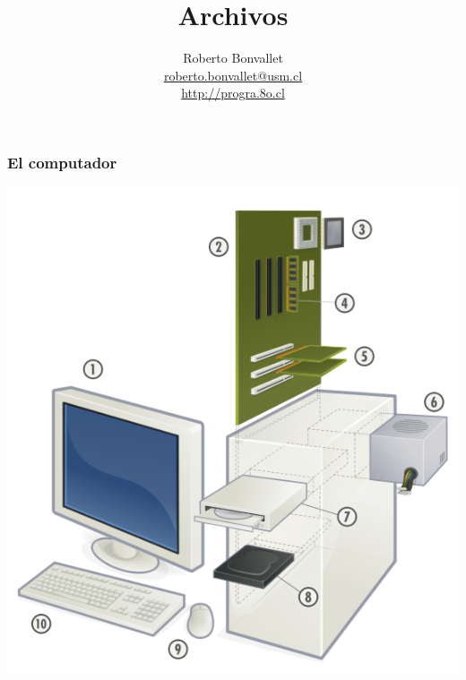 \documentclass[12pt]{beamer}
\title{Archivos}
\author{
  Roberto Bonvallet \\
  \url{roberto.bonvallet@usm.cl} \\
  \url{http://progra.8o.cl}
}
\begin{document}
  \begin{frame}
    \maketitle
  \end{frame}

  \begin{frame}
    \frametitle{El computador}
    \includegraphics[scale=.4]{compu}
  \end{frame}
\end{document}
